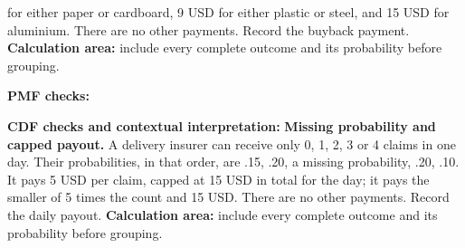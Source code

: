 for either paper or cardboard, 9 USD for either plastic or steel, and 15 USD for aluminium. There are no other
payments. Record the buyback payment.
\textbf{Calculation area:} include every complete outcome and its probability before grouping.
\par%
\noindent%
\begin{minipage}[t]{.37\linewidth}%
  \vspace{0pt}\centering
\end{minipage}%
\hfill%
\begin{minipage}[t]{.60\linewidth}%
  \vspace{0pt}\centering
\end{minipage}%
\par
\textbf{PMF checks:} \hrulefill%
\par
{}
\par%
\noindent%
\begin{minipage}[t]{.37\linewidth}%
  \vspace{0pt}\centering
\end{minipage}%
\hfill%
\begin{minipage}[t]{.60\linewidth}%
  \vspace{0pt}\centering
\end{minipage}%
\par
\textbf{CDF checks and contextual interpretation:}
\vfill
\clearpage
{}
\textbf{Missing probability and capped payout.} A delivery insurer can receive only 0, 1, 2, 3 or 4 claims in
one day. Their probabilities, in that order, are .15, .20, a missing probability, .20, .10. It pays 5 USD per
claim, capped at 15 USD in total for the day; it pays the smaller of 5 times the count and 15 USD. There are
no other payments. Record the daily payout.
\textbf{Calculation area:} include every complete outcome and its probability before grouping.
